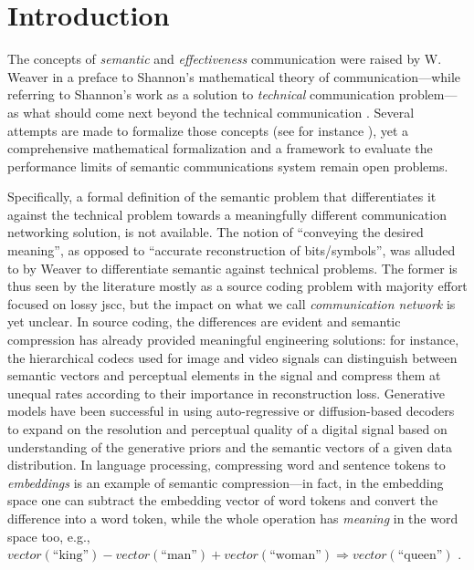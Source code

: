 \section{Introduction}
\label{sec:intro}

The concepts of \emph{semantic} and \emph{effectiveness} communication were raised by W. Weaver in a preface to Shannon's mathematical theory of communication---while referring to Shannon's work as a solution to  \emph{technical} communication problem---as what should come next beyond the technical communication \cite{shannon1998mathematical}. Several attempts are made to formalize those concepts (see for instance \cite{floridi2004outline,isaac2019semantics,zhong2017theory,shao2024theory,saz2024model}), yet a comprehensive mathematical formalization and a framework to evaluate the performance limits of semantic communications system remain  open problems. 

Specifically, a formal definition of the semantic  problem that differentiates it against the technical  problem  towards a meaningfully different communication networking solution, is  not available. The notion of ``conveying  the desired meaning'', as opposed to ``accurate reconstruction of bits/symbols'', was alluded to by Weaver to differentiate semantic against technical problems. The former is thus seen by the literature mostly  as a source coding problem with majority effort focused on lossy \gls{jscc}, but the  impact on what we call \emph{communication network} is yet unclear. In source coding, the differences are  evident and semantic compression has already provided meaningful engineering solutions: for instance, the hierarchical codecs used for image \cite{li2022deep,huang2021deep,yang2015visual,7226830} and video \cite{zhu2003hierarchical,zhai2005joint} signals can distinguish between semantic vectors and perceptual elements in the signal and compress them at unequal rates according to their importance in reconstruction loss. Generative models have been successful in using  auto-regressive or diffusion-based decoders to expand on the resolution and perceptual quality of a digital signal based on  understanding of the generative priors \cite{kingma2022autoencodingvariationalbayes,chen2024generative} and the semantic vectors \cite{tang2024evolving} of a given data distribution. In language processing, compressing word and sentence tokens to \emph{embeddings} is an example of semantic compression---in fact, in the embedding space one can subtract   the embedding vector of word tokens and convert the difference into a word token, while the whole operation has \emph{meaning} in the word space too, e.g., $   vector (\text{``king''}) - vector (\text{``man''}) +  vector (\text{``woman''}) \Rightarrow vector (\text{``queen''})$  \cite{mikolov2013efficient}. %

